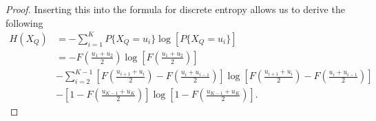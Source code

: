 \documentclass[12pt,onecolumn, margin=1in]{IEEEtran}
\newcommand{\bracket}[1]{\left[ #1 \right]}
\newcommand{\paren}[1]{\left( #1 \right)}
\begin{document}
\begin{proof}
Inserting this into the formula for discrete entropy allows us to derive the following
\begin{equation}
    \begin{aligned}
        H(X_Q) & = - \sum_{i = 1}^K P\{X_Q = u_i\} \log\bracket{P\{X_Q = u_i\}} \\
        & = -F\paren{\frac{u_1 + u_2}{2}}\log\bracket{F\paren{\frac{u_1 + u_2}{2}}}\\
        &- \sum_{i = 2}^{K-1}\bracket{F\paren{\frac{u_{i+1} + u_i}{2}} - F\paren{\frac{u_{i} + u_{i-1}}{2}}}\log\bracket{F\paren{\frac{u_{i+1} + u_i}{2}} - F\paren{\frac{u_{i} + u_{i-1}}{2}}}\\
        &-\bracket{1 - F\paren{\frac{u_{K-1} + u_K}{2}}}\log\bracket{1 - F\paren{\frac{u_{K-1} + u_K}{2}}}.
        \end{aligned}
\end{equation}
    
\end{proof}
\end{document}
